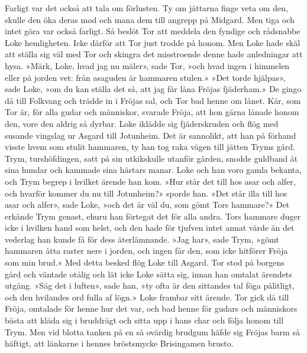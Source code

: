 Farligt var det också att tala om förlusten. Ty om jättarna finge veta
om den, skulle den öka deras mod och mana dem till angrepp på Midgard.
Men tiga och intet göra var också farligt. Så beslöt Tor att meddela den
fyndige och rådsnabbe Loke hemligheten. Icke därför att Tor just trodde
på honom. Men Loke hade skäl att ställa sig väl med Tor och skingra det
misstroende denne hade anledningar att hysa. »Märk, Loke, hvad jag nu
mäler», sade Tor, »och hvad ingen i himmelen eller på jorden vet: från
asaguden är hammaren stulen.» »Det torde hjälpas», sade Loke, »om du kan
ställa det så, att jag får låna Fröjas fjäderham.» De gingo då till
Folkvang och trädde in i Fröjas sal, och Tor bad henne om lånet. Kär,
som Tor är, för alla gudar och människor, svarade Fröja, att hon gärna
lånade honom den, vore den aldrig så dyrbar. Loke iklädde sig
fjäderskruden och flög med susande vingslag ur Asgard till Jotunheim.
Det är sannolikt, att han på förhand visste hvem som stulit hammaren, ty
han tog raka vägen till jätten Tryms gård. Trym, turshöfdingen, satt på
sin utkikskulle utanför gården, snodde guldband åt sina hundar och
kammade sina hästars
\protect\hypertarget{lb1625905.xhtmlux5cux23start57}{}{}\protect\hypertarget{lb1625905.xhtmlux5cux23start57-a}{}{}\protect\hypertarget{lb1625905.xhtmlux5cux23start57-b}{}{}\protect\hypertarget{lb1625905.xhtmlux5cux23start57-c}{}{}\protect\hypertarget{lb1625905.xhtmlux5cux23start57-d}{}{}
manar. Loke och han voro gamla bekanta, och Trym begrep i hvilket ärende
han kom. »Hur står det till hos asar och alfer, och hvarför kommer du nu
till Jotunheim?» sporde han. »Det står illa till hos asar och alfer»,
sade Loke, »och det är väl du, som gömt Tors hammare?» Det erkände Trym
genast, ehuru han förtegat det för alla andra. Tors hammare duger icke i
hvilken hand som helst, och den hade för tjufven intet annat värde än
det vederlag han kunde få för dess återlämnande. »Jag har», sade Trym,
»gömt hammaren åtta raster nere i jorden, och ingen får den, som icke
hitförer Fröja som min brud.» Med detta besked flög Loke till Asgard.
Tor stod på borgens gård och väntade otålig och lät icke Loke sätta sig,
innan han omtalat ärendets utgång. »Säg det i luften», sade han, »ty
ofta är den sittandes tal föga pålitligt, och den hvilandes ord fulla af
lögn.» Loke frambar sitt ärende. Tor gick då till Fröja, omtalade för
henne hur det var, och bad henne för gudars och människors bästa att
kläda sig i bruddrägt och sitta upp i hans char och följa honom till
Trym. Men vid blotta tanken på en så ovärdig brudgum häfde sig Fröjas
barm så häftigt, att länkarne i hennes bröstsmycke Brisingamen brusto.
